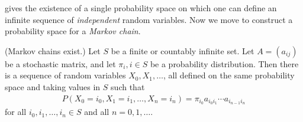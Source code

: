 \documentclass{article} %
\begin{document}
\cite[Thm.~4.11.1]{ash2000probability} gives the existence of a single probability space on which one can define an infinite sequence of \textit{independent} random variables.  Now we move to construct a probability space for a \textit{Markov chain}.

\begin{theorem}\textnormal{(Markov chains exist.)}
Let $S$ be a finite or countably infinite set.  Let $A=(a_{ij})$ be a stochastic matrix, and let $\pi_i, i \in S$ be a probability distribution.  Then there is a sequence of random variables $X_0, X_1, \hdots$, all defined on the same probability space and taking values in $S$ such that
%
\begin{align}
P(X_0=i_0, X_1=i_1, \hdots, X_n=i_n) = \pi_{i_0} a_{i_0i_1} \cdots a_{i_{n-1}i_n} 
\label{eqn:markov_chain_head_probability}	
\end{align}
%
for all $i_0, i_1, \hdots, i_n \in S$ and all $n=0,1,\hdots$.
\label{thm:markov_chains_exist}
\end{theorem}
\end{document}
